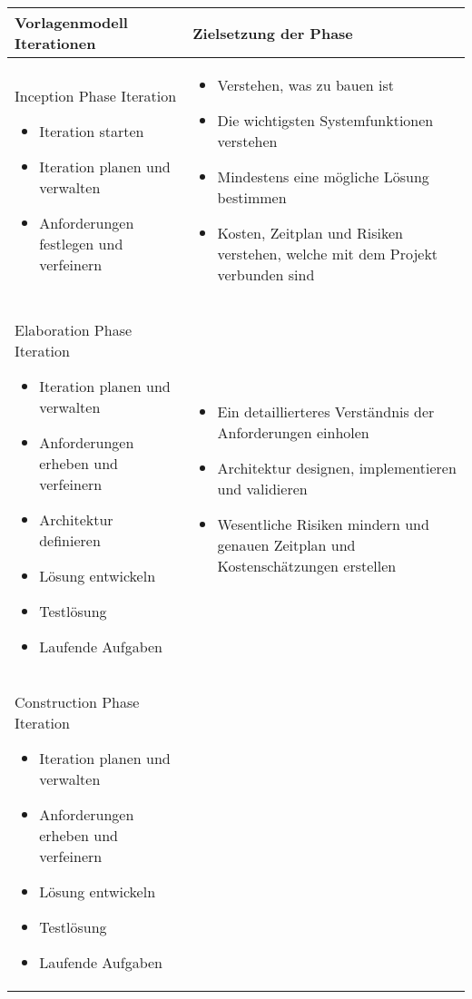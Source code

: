 \begin{longtable}{|p{6cm}|p{8cm}|}
\hline
Vorlagenmodell Iterationen & Zielsetzung der Phase \\
\hline
Inception Phase Iteration 
\begin {itemize}
\item Iteration starten 
 \item  Iteration planen und verwalten
 \item  Anforderungen festlegen und verfeinern 
  \end{itemize}
   &
  
  \begin {itemize}
\item Verstehen, was zu bauen ist
 \item Die wichtigsten Systemfunktionen verstehen 
\item Mindestens eine mögliche Lösung bestimmen
\item Kosten, Zeitplan und Risiken verstehen, welche mit dem Projekt verbunden sind
  \end{itemize}

 \\
\hline
 Elaboration Phase Iteration 
   \begin {itemize}
   \item Iteration planen und verwalten
   \item Anforderungen erheben und verfeinern
   \item Architektur definieren
   \item Lösung entwickeln
   \item Testlösung
   \item Laufende Aufgaben
   
  \end{itemize}

  & 
     \begin {itemize}
   \item Ein detaillierteres Verständnis der Anforderungen einholen
   \item Architektur designen, implementieren und validieren
   \item  Wesentliche Risiken mindern und genauen Zeitplan und Kostenschätzungen erstellen
    \end{itemize}
 \\
\hline
\hline
Construction Phase Iteration 
   \begin {itemize}
   \item Iteration planen und verwalten
   \item Anforderungen erheben und verfeinern
     \item Lösung entwickeln
   \item Testlösung
   \item Laufende Aufgaben


\end{itemize}
\end{longtable}
